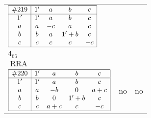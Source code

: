 \documentclass[12pt]{article}
\newcommand\RRA{\operatorname{RRA}}
\newcommand{\join}{\mathbin{+}}%
\newcommand{\id}{{1'}}%
\begin{document}
\begin{center}
\begin{longtable}{l|c|c}
$
\begin{array}{|c|cccc|} \hline
\#219 & \id & a & b & c \\ \hline
\id & \id & a & b & c \\
a & a & -c & a & c \\
b & b & a & \id \join b & c \\
c & c & c & c & -c \\ \hline
\end{array}
$
 & \begin{tabular}{c} yes \\ $4_{65}$ \\ $\RRA$ \end{tabular} 
 & \adjustbox{valign=c, max height=1.6cm}{$
\left[ \begin{array}{cccccc}
\id & a & a & b & c & b \\ 
a & \id & a & a & c & a \\ 
a & a & \id & a & c & a \\ 
b & a & a & \id & c & b \\ 
c & c & c & c & \id & c \\ 
b & a & a & b & c & \id
\end{array}\right]
$}      \\[15mm]

$
\begin{array}{|c|cccc|} \hline
\#220 & \id & a & b & c \\ \hline
\id & \id & a & b & c \\
a & a & -b & 0 & a \join c \\
b & b & 0 & \id \join b & c \\
c & c & a \join c & c & -c \\ \hline
\end{array}
$
 & no  
 & no     \\[15mm]


\end{longtable}
\end{center}
\end{document}
